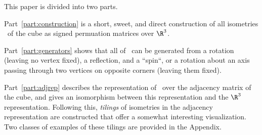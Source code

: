 This paper is divided into two parts.

Part~\ref{part:construction} is a short, sweet, and direct construction of all isometries
\IsomC\ of the cube as signed permuation matrices over $\R^3$.

Part~\ref{part:generators} shows that all of \IsomC\ can be generated from a rotation (leaving
no vertex fixed), a reflection, and a ``spin``, or a rotation about an axis passing through
two vertices on opposite corners (leaving them fixed).

Part~\ref{part:adjrep} describes the representation of \IsomC\ over the adjacency matrix of
the cube, and gives an isomorphism between this representation and the $\R^3$ representation.
Following this, \emph{tilings} of isometries in the adjacency representation are constructed
that offer a somewhat interesting visualization. Two classes of examples of these tilings are
provided in the Appendix.
